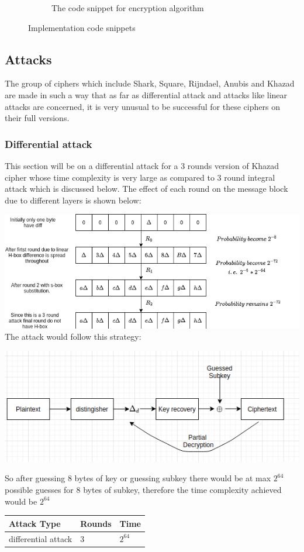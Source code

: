 \documentclass[preprint]{transcrypto}
\begin{document}
\begin{figure}[H]
\begin{subfigure}{.5\textwidth}
			\caption{The code snippet for encryption algorithm}
			\label{fig:sub-third}
		\end{subfigure}
		\caption{Implementation code snippets}
		\label{fig:fig:fig}
	\end{figure}
\subsection{Attacks} 
The group of ciphers which include Shark, Square, Rijndael,
Anubis and Khazad are made in such a way that
as far as differential attack and attacks like linear attacks are concerned, it is very unusual
to be successful for these ciphers on their full versions.
\subsubsection{Differential attack}
This section will be on a differential attack for a 3 rounds version of Khazad cipher whose time complexity is very large as compared to 3 round integral attack which is discussed below. The effect of each round on the message block due to different layers is shown below:\\
\begin{center}
    \includegraphics[scale=0.6]{Screenshots/diffat.png} \\
    The attack would follow this strategy:
\end{center}
\begin{center}
    \includegraphics[scale=0.5]{Screenshots/pd.png}
\end{center}
So after guessing 8 bytes of key or guessing subkey there would be at max $2^{64}$ possible guesses for 8 bytes of subkey, therefore the time complexity achieved would be $2^{64}$
\begin{table}[h]
\centering
\begin{tabular}{|l|l|l|}
\hline
Attack Type     & Rounds & Time     \\ \hline
differential attack & 3      & $2^{64}$  \\ \hline
\end{tabular}
\end{table} 
\newpage
\end{document}
